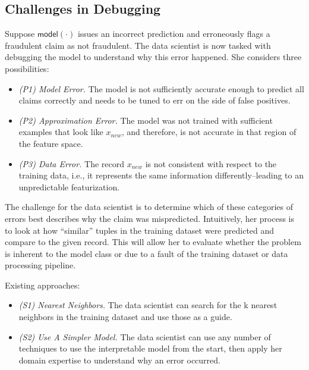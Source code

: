 \subsection{Challenges in Debugging}
Suppose $\textsf{model}(\cdot)$ issues an incorrect prediction and erroneously flags a fraudulent claim as not fraudulent. The data scientist is now tasked with debugging the model to understand why this error happened. 
She considers three possibilities: 
\begin{itemize}
\item \emph{(P1) Model Error.} The model is not sufficiently accurate enough to predict all claims correctly and needs to be tuned to err on the side of false positives.
\item \emph{(P2) Approximation Error.} The model was not trained with sufficient examples that look like $x_{new}$, and therefore, is not accurate in that region of the feature space.
\item \emph{(P3) Data Error.} The record $x_{new}$ is not consistent with respect to the training data, i.e., it represents the same information differently--leading to an unpredictable featurization.
\end{itemize}
The challenge for the data scientist is to determine which of these categories of errors best describes why the claim was mispredicted.
Intuitively, her process is to look at how ``similar'' tuples in the training dataset were predicted and compare to the given record. This will allow her to evaluate whether the problem is inherent to the model class or due to a fault of the training dataset or data processing pipeline. 

Existing approaches: 
\begin{itemize}
\item \emph{(S1) Nearest Neighbors. } The data scientist can search for the k nearest neighbors in the training dataset and use those as a guide.

\item \emph{(S2) Use A Simpler Model.} The data scientist can use any number of techniques to use the interpretable model from the start, then apply her domain expertise to understand why an error occurred.
\end{itemize}

